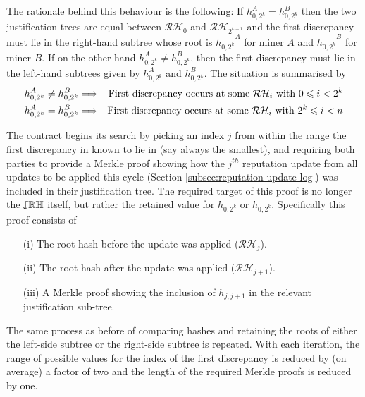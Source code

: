 The rationale behind this behaviour is the following: If $h_{0,2^k}^A = h_{0,2^k}^B$ then the two justification trees are equal between $\mathcal{RH}_0$ and $\mathcal{RH}_{2^{k-1}}$ and the first discrepancy must lie in the right-hand subtree whose root is $\overline{h_{0,2^k}}^A$ for miner $A$ and $\overline{h_{0,2^k}}^B$ for miner $B$. If on the other hand $h_{0,2^k}^A \neq h_{0,2^k}^B$, then the first discrepancy must lie in the left-hand subtrees given by $h_{0,2^k}^A$ and $h_{0,2^k}^B$. The situation is summarised by
\begin{eqnarray*}
 h_{0,2^k}^A \neq h_{0,2^k}^B & \Longrightarrow & \textnormal{First discrepancy occurs at some } \mathcal{RH}_i \textnormal{ with } 0 \leqslant i < 2^k\\
 h_{0,2^k}^A = h_{0,2^k}^B & \Longrightarrow & \textnormal{First discrepancy occurs at some } \mathcal{RH}_i \textnormal{ with } 2^k \leqslant i < n
\end{eqnarray*}

The contract begins its search by %
%
picking an index $j$ from within the range the first discrepancy in known to lie in (say always the smallest), and requiring both parties to provide a Merkle proof showing how the $j^{th}$ reputation update from all updates to be applied this cycle (Section \ref{subsec:reputation-update-log}) was included in their justification tree. The required target of this proof is no longer the $\mathbb{JRH}$ itself, but rather the retained value for $h_{0,2^k}$ or $\overline{h_{0,2^k}}$. Specifically this proof consists of

\begin{itemize}
 \item[(i)] The root hash before the update was applied ($\mathcal{RH}_{j}$).
 \item[(ii)] The root hash after the update was applied ($\mathcal{RH}_{j+1}$).
 \item[(iii)] A Merkle proof showing the inclusion of $h_{j,j+1}$ in the relevant justification sub-tree.
\end{itemize}

The same process as before of comparing hashes and retaining the roots of either the left-side subtree or the right-side subtree is repeated. With each iteration, the range of possible values for the index of the first discrepancy is reduced by (on average) a factor of two and the length of the required Merkle proofs is reduced by one.

